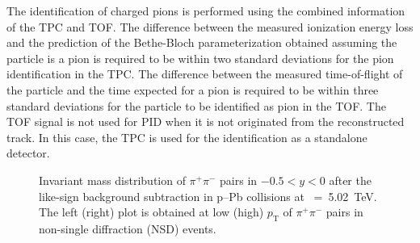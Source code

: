 The identification of charged pions is performed using the combined information of the TPC and TOF. The difference between the measured ionization energy loss and the prediction of the Bethe-Bloch parameterization obtained assuming the particle is a pion is required to be within two standard deviations for the pion identification in the TPC. The difference between the measured time-of-flight of the particle and the time expected for a pion is required to be within three standard deviations for the particle to be identified as pion in the TOF. The TOF signal is not used for PID when it is not originated from the reconstructed track. In this case, the TPC is used for the identification as a standalone detector.

\label{sec:ana}
\begin{figure}[hbt!]
	\centering
	\caption{ Invariant mass distribution of $\pi^{+}\pi^{-}$ pairs in $-0.5<y<0$ after the like-sign background subtraction in p--Pb collisions at \snn~=~5.02~TeV. The left (right) plot is obtained at low (high) $p_{\mathrm{T}}$ of $\pi^{+}\pi^{-}$ pairs in non-single diffraction (NSD) events. }
	\label{fig:SigExt}
\end{figure}

